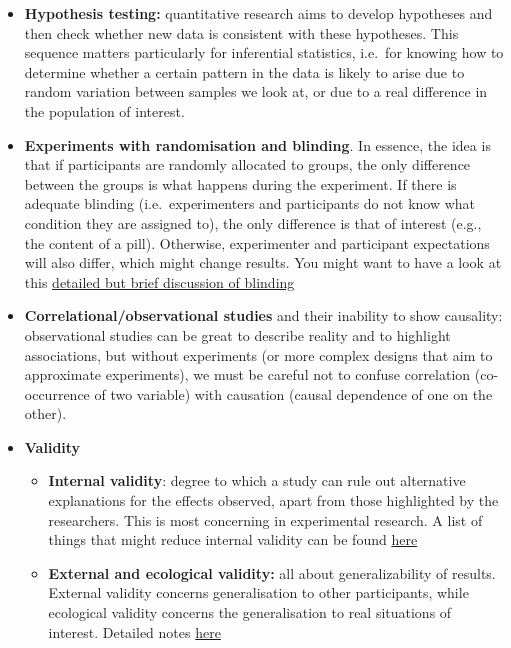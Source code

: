\documentclass[
]{book}
\providecommand{\tightlist}{%
  \setlength{\itemsep}{0pt}\setlength{\parskip}{0pt}}
\begin{document}
\begin{itemize}
\item
  \textbf{Hypothesis testing:} quantitative research aims to develop hypotheses and then check whether new data is consistent with these hypotheses. This sequence matters particularly for inferential statistics, i.e.~for knowing how to determine whether a certain pattern in the data is likely to arise due to random variation between samples we look at, or due to a real difference in the population of interest.
\item
  \textbf{Experiments with randomisation and blinding}. In essence, the idea is that if participants are randomly allocated to groups, the only difference between the groups is what happens during the experiment. If there is adequate blinding (i.e.~experimenters and participants do not know what condition they are assigned to), the only difference is that of interest (e.g., the content of a pill). Otherwise, experimenter and participant expectations will also differ, which might change results. You might want to have a look at this \href{https://s4be.cochrane.org/blog/2017/06/26/blinding-comprehensive-guide-students/}{detailed but brief discussion of blinding}
\item
  \textbf{Correlational/observational studies} and their inability to show causality: observational studies can be great to describe reality and to highlight associations, but without experiments (or more complex designs that aim to approximate experiments), we must be careful not to confuse correlation (co-occurrence of two variable) with causation (causal dependence of one on the other).
\item
  \textbf{Validity}

  \begin{itemize}
  \tightlist
  \item
    \textbf{Internal validity}: degree to which a study can rule out alternative explanations for the effects observed, apart from those highlighted by the researchers. This is most concerning in experimental research. A list of things that might reduce internal validity can be found \href{https://researchbasics.education.uconn.edu/experimental-_research/}{here}
  \item
    \textbf{External and ecological validity:} all about generalizability of results. External validity concerns generalisation to other participants, while ecological validity concerns the generalisation to real situations of interest. Detailed notes \href{https://researchbasics.education.uconn.edu/external_validity/\#}{here}
  \end{itemize}
\end{itemize}
\end{document}
